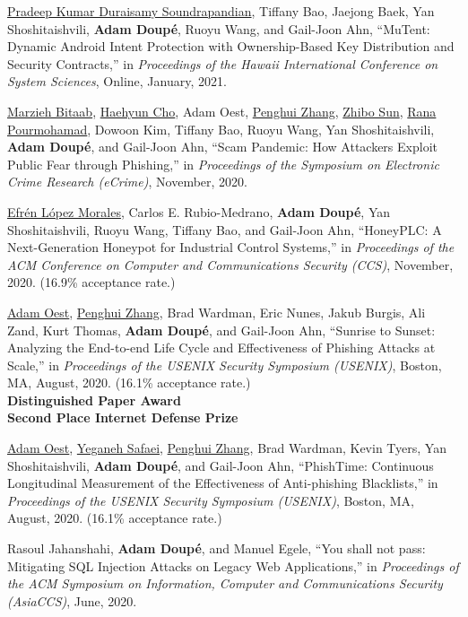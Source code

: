 \documentclass[11pt,letterpaper,sans]{moderncv}
\begin{document}
\begin{etaremune}
\item \underline{Pradeep Kumar Duraisamy Soundrapandian}, Tiffany Bao, Jaejong Baek, Yan Shoshitaishvili, \textbf{Adam Doup\'e}, Ruoyu Wang, and Gail-Joon Ahn, ``MuTent: Dynamic Android Intent Protection with Ownership-Based Key Distribution and Security Contracts,'' in \emph{Proceedings of the Hawaii International Conference on System Sciences}, Online, January, 2021.

\item \underline{Marzieh Bitaab}, \underline{Haehyun Cho}, Adam Oest, \underline{Penghui Zhang}, \underline{Zhibo Sun}, \underline{Rana Pourmohamad}, Dowoon Kim, Tiffany Bao, Ruoyu Wang, Yan Shoshitaishvili, \textbf{Adam Doup\'e}, and Gail-Joon Ahn, ``Scam Pandemic: How Attackers Exploit Public Fear through Phishing,'' in \emph{Proceedings of the Symposium on Electronic Crime Research (eCrime)}, November, 2020.

\item \underline{Efr\'en L\'opez Morales}, Carlos E. Rubio-Medrano, \textbf{Adam Doup\'e}, Yan Shoshitaishvili, Ruoyu Wang, Tiffany Bao, and Gail-Joon Ahn, ``HoneyPLC: A Next-Generation Honeypot for Industrial Control Systems,'' in \emph{Proceedings of the ACM Conference on Computer and Communications Security (CCS)}, November, 2020. (16.9\% acceptance rate.)

\item \underline{Adam Oest}, \underline{Penghui Zhang}, Brad Wardman, Eric Nunes, Jakub Burgis, Ali Zand, Kurt Thomas, \textbf{Adam Doup\'e}, and Gail-Joon Ahn, ``Sunrise to Sunset: Analyzing the End-to-end Life Cycle and Effectiveness of Phishing Attacks at Scale,'' in \emph{Proceedings of the USENIX Security Symposium (USENIX)}, Boston, MA, August, 2020. (16.1\% acceptance rate.) \\
  \textbf{Distinguished Paper Award} \\
  \textbf{Second Place Internet Defense Prize}

\item \underline{Adam Oest}, \underline{Yeganeh Safaei}, \underline{Penghui Zhang}, Brad Wardman, Kevin Tyers, Yan Shoshitaishvili, \textbf{Adam Doup\'e}, and Gail-Joon Ahn, ``PhishTime: Continuous Longitudinal Measurement of the Effectiveness of Anti-phishing Blacklists,'' in \emph{Proceedings of the USENIX Security Symposium (USENIX)}, Boston, MA, August, 2020. (16.1\% acceptance rate.)

\item Rasoul Jahanshahi, \textbf{Adam Doup\'e}, and Manuel Egele, ``You shall not pass: Mitigating SQL Injection Attacks on Legacy Web Applications,'' in \emph{Proceedings of the ACM Symposium on Information, Computer and Communications Security (AsiaCCS)}, June, 2020.


\end{etaremune}
\end{document}
